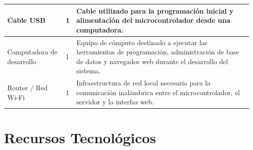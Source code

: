 \begin{longtable}{|p{3.5cm}|p{2.5cm}|p{8cm}|}
Cable USB & 1 &
Cable utilizado para la programación inicial y alimentación del microcontrolador desde una computadora. \\
\hline

Computadora de desarrollo & 1 &
Equipo de cómputo destinado a ejecutar las herramientas de programación, administración de base de datos y navegador web durante el desarrollo del sistema. \\
\hline

Router / Red Wi-Fi & 1 &
Infraestructura de red local necesaria para la comunicación inalámbrica entre el microcontrolador, el servidor y la interfaz web. \\
\hline

\end{longtable}

\newpage





\section{Recursos Tecnológicos}

